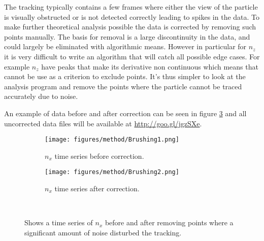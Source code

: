 \label{sec:brushing}
The tracking typically contains a few frames where either the view of the particle is visually obstructed or is not detected correctly 
leading to spikes in the data. To make further theoretical analysis possible the data is corrected by removing such points manually. The basis for removal is a large discontinuity in the data, and could largely be eliminated with algorithmic means. However in particular for $n_z$ it is very difficult to write an algorithm that will catch all possible edge cases. For example $n_z$ have peaks that make its derivative non continuous which means that cannot be use as a criterion to exclude points. It's thus simpler to look at the analysis program and remove the points where the particle cannot be traced accurately due to noise. 

An example of data before and after correction can be seen in figure \ref{fig:brushed} and all uncorrected data files will be available at \url{http://goo.gl/jgzSXe}.

\begin{figure}[H]
\centering
\begin{subfigure}[3a]{0.40\textwidth}
\texttt{[image: figures/method/Brushing1.png]}
\caption{$n_x$ time series before correction.}\label{fig:prebrush}
\end{subfigure}\hspace{1em}%
\begin{subfigure}[3b]{0.40\textwidth}
\texttt{[image: figures/method/Brushing2.png]}
\caption{$n_x$ time series after correction.}\label{fig:postbrush}
\end{subfigure} \\
\caption{Shows a time series of $n_x$ before and after removing points where a significant amount of noise disturbed the tracking. } \label{fig:brushed}
\end{figure}
